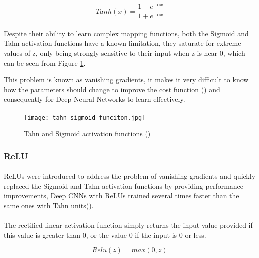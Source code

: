 \begin{equation}
    \label{tanh_eq}
    Tanh(x) = \frac{1 - e^{-\alpha x}}{1 + e^{-\alpha x}} 
\end{equation}
\paragraph{}
Despite their ability to learn complex mapping functions, both the Sigmoid and Tahn activation functions have a known limitation, they saturate for extreme values of z, only being strongly sensitive to their input when z is near 0, which can be seen from Figure \ref{fig_tahn_sigmoid}. 

This problem is known as vanishing gradients, it makes it very difficult to know how the parameters should change to improve the cost function (\cite{GoodBengCour16}) and consequently for Deep Neural Networks to learn effectively.
\paragraph{}
\begin{figure}[hbt!]
    \centering
    \texttt{[image: tahn sigmoid funciton.jpg]}
    \caption{Tahn and Sigmoid activation functions (\cite{tahnfunc})}
    \label{fig_tahn_sigmoid}

\end{figure}

\subsubsection{\gls{ReLU}}
\paragraph{}
\gls{ReLU}s were introduced to address the problem of vanishing gradients and quickly replaced the Sigmoid and Tahn activation functions by providing  performance improvements, Deep \gls{CNN}s with \gls{ReLU}s trained several times faster than the same ones with Tahn units(\cite{GoodBengCour16}).

\paragraph{}
The rectified linear activation function simply returns the input value provided if this value is greater than 0, or the value 0 if the input is 0 or less.

\begin{equation}
    \label{eq_relu}
    Relu(z) = max(0, z)
\end{equation}

